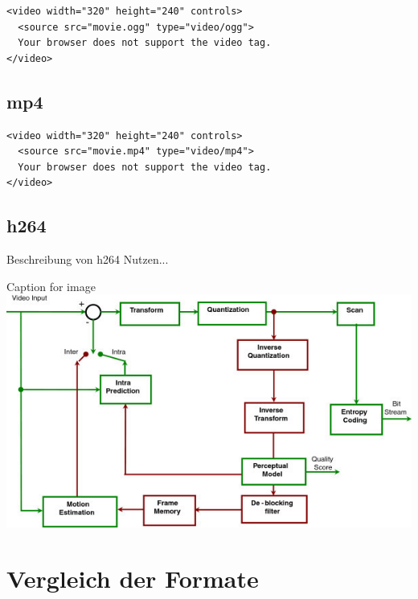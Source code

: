 \begin{verbatim}
<video width="320" height="240" controls>
  <source src="movie.ogg" type="video/ogg">
  Your browser does not support the video tag.
</video> 
\end{verbatim}

\subsection{mp4}



\begin{verbatim}
<video width="320" height="240" controls>
  <source src="movie.mp4" type="video/mp4">
  Your browser does not support the video tag.
</video> 
\end{verbatim}

\subsection{h264}

Beschreibung von h264 Nutzen...

\begin{minipage}{\textwidth}
    \begin{center}
        Caption for image
        \includegraphics[scale=4.0]{img/h264.jpg} 
    \end{center}
\end{minipage}




\newpage
\section{Vergleich der Formate}

